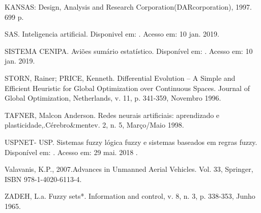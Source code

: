 \documentclass[10pt,a4paper]{article}
\numberwithin{equation}{section}
\begin{document}
\par KANSAS: Design, Analysis and Research Corporation(DARcorporation), 1997. 699 p. \\

\par SAS. Inteligencia artificial. Disponivel em: \hfill \break {}. Acesso em: 10 jan. 2019.\\


\par SISTEMA CENIPA. Aviões sumário estatístico. Disponível em: \hfill   {}. Acesso em: 10 jan. 2019. \\

\par STORN, Rainer; PRICE, Kenneth. Differential Evolution – A Simple and Efficient Heuristic for Global Optimization over Continuous Spaces. Journal of Global Optimization, Netherlands,       v. 11, p. 341-359, Novembro 1996.\\

\par TAFNER, Malcon Anderson. Redes neurais artificiais: aprendizado e plasticidade,.Cérebro\&mentev. 2, n. 5,  Março/Maio 1998.\\

\par USPNET- USP. Sistemas fuzzy lógica fuzzy e sistemas baseados em regras fuzzy. Disponível em: . Acesso em: 29 mai. 2018 .\\

\par Valavanis, K.P., 2007.Advances in Unmanned Aerial Vehicles. Vol. 33, Springer, ISBN 978-1-4020-6113-4.\\

\par ZADEH, L.a. Fuzzy sets*. Information and control, v. 8, n. 3, p. 338-353, Junho 1965.
\end{document}
